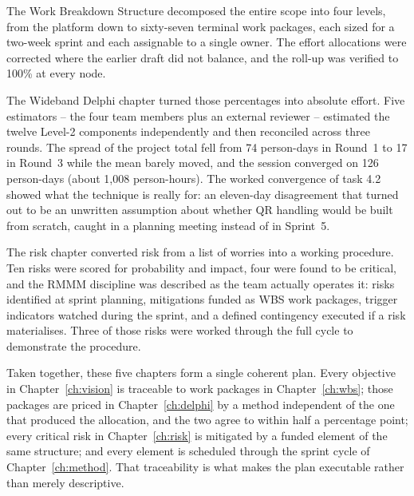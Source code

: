 \documentclass[11pt,a4paper]{report}
\begin{document}
The Work Breakdown Structure decomposed the entire scope into four levels, from
the platform down to sixty-seven terminal work packages, each sized for a
two-week sprint and each assignable to a single owner. The effort allocations
were corrected where the earlier draft did not balance, and the roll-up was
verified to 100\% at every node.

The Wideband Delphi chapter turned those percentages into absolute effort. Five
estimators -- the four team members plus an external reviewer -- estimated the
twelve Level-2 components independently and then reconciled across three rounds.
The spread of the project total fell from 74 person-days in Round~1 to 17 in
Round~3 while the mean barely moved, and the session converged on 126 person-days
(about 1{,}008 person-hours). The worked convergence of task 4.2 showed what the
technique is really for: an eleven-day disagreement that turned out to be an
unwritten assumption about whether QR handling would be built from scratch,
caught in a planning meeting instead of in Sprint~5.

The risk chapter converted risk from a list of worries into a working procedure.
Ten risks were scored for probability and impact, four were found to be critical,
and the RMMM discipline was described as the team actually operates it: risks
identified at sprint planning, mitigations funded as WBS work packages, trigger
indicators watched during the sprint, and a defined contingency executed if a
risk materialises. Three of those risks were worked through the full cycle to
demonstrate the procedure.

Taken together, these five chapters form a single coherent plan. Every objective
in Chapter~\ref{ch:vision} is traceable to work packages in
Chapter~\ref{ch:wbs}; those packages are priced in Chapter~\ref{ch:delphi} by a
method independent of the one that produced the allocation, and the two agree to
within half a percentage point; every critical risk in Chapter~\ref{ch:risk} is
mitigated by a funded element of the same structure; and every element is
scheduled through the sprint cycle of Chapter~\ref{ch:method}. That traceability
is what makes the plan executable rather than merely descriptive.
\end{document}

